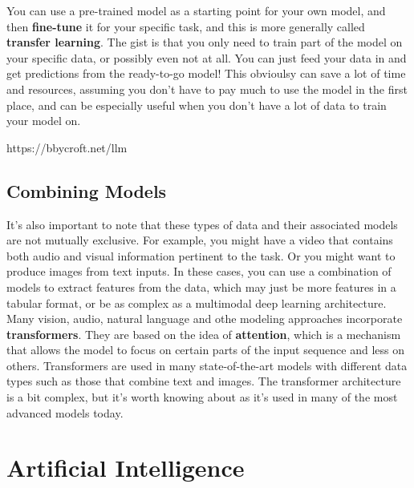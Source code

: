 \documentclass[
  letterpaper,
]{krantz}
\begin{document}
You can use a pre-trained model as a starting point for your own model,
and then \textbf{fine-tune} it for your specific task, and this is more
generally called \textbf{transfer learning}. The gist is that you only
need to train part of the model on your specific data, or possibly even
not at all. You can just feed your data in and get predictions from the
ready-to-go model! This obvioulsy can save a lot of time and resources,
assuming you don't have to pay much to use the model in the first place,
and can be especially useful when you don't have a lot of data to train
your model on.

https://bbycroft.net/llm

\subsection{Combining Models}\label{combining-models}

It's also important to note that these types of data and their
associated models are not mutually exclusive. For example, you might
have a video that contains both audio and visual information pertinent
to the task. Or you might want to produce images from text inputs. In
these cases, you can use a combination of models to extract features
from the data, which may just be more features in a tabular format, or
be as complex as a multimodal deep learning architecture. Many vision,
audio, natural language and othe modeling approaches incorporate
\textbf{transformers}. They are based on the idea of \textbf{attention},
which is a mechanism that allows the model to focus on certain parts of
the input sequence and less on others. Transformers are used in many
state-of-the-art models with different data types such as those that
combine text and images. The transformer architecture is a bit complex,
but it's worth knowing about as it's used in many of the most advanced
models today.

\section{Artificial Intelligence}\label{artificial-intelligence}
\end{document}
